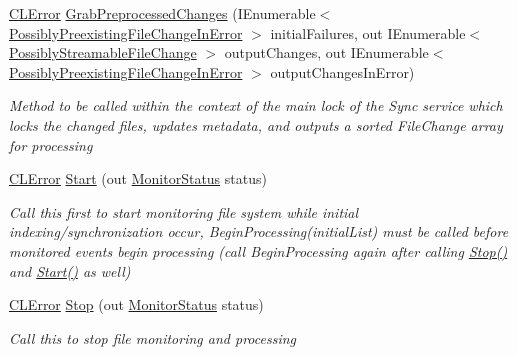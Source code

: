 \begin{DoxyCompactItemize}
\item 
\hyperlink{class_cloud_api_public_1_1_model_1_1_c_l_error}{C\-L\-Error} \hyperlink{class_file_monitor_1_1_monitor_agent_abb33d7c21700394389e5be0801b6f290}{Grab\-Preprocessed\-Changes} (I\-Enumerable$<$ \hyperlink{struct_cloud_api_public_1_1_model_1_1_possibly_preexisting_file_change_in_error}{Possibly\-Preexisting\-File\-Change\-In\-Error} $>$ initial\-Failures, out I\-Enumerable$<$ \hyperlink{struct_cloud_api_public_1_1_model_1_1_possibly_streamable_file_change}{Possibly\-Streamable\-File\-Change} $>$ output\-Changes, out I\-Enumerable$<$ \hyperlink{struct_cloud_api_public_1_1_model_1_1_possibly_preexisting_file_change_in_error}{Possibly\-Preexisting\-File\-Change\-In\-Error} $>$ output\-Changes\-In\-Error)
\begin{DoxyCompactList}\small\item\em Method to be called within the context of the main lock of the Sync service which locks the changed files, updates metadata, and outputs a sorted File\-Change array for processing \end{DoxyCompactList}\item 
\hyperlink{class_cloud_api_public_1_1_model_1_1_c_l_error}{C\-L\-Error} \hyperlink{class_file_monitor_1_1_monitor_agent_a1fc5bca23e82e87243e4e64743b8cd6d}{Start} (out \hyperlink{namespace_cloud_api_public_1_1_static_a31db95951688473984962a22ad05a45f}{Monitor\-Status} status)
\begin{DoxyCompactList}\small\item\em Call this first to start monitoring file system while initial indexing/synchronization occur, Begin\-Processing(initial\-List) must be called before monitored events begin processing (call Begin\-Processing again after calling \hyperlink{class_file_monitor_1_1_monitor_agent_ab12233c2b615d78afb7608477f7f4d70}{Stop()} and \hyperlink{class_file_monitor_1_1_monitor_agent_a1fc5bca23e82e87243e4e64743b8cd6d}{Start()} as well) \end{DoxyCompactList}\item 
\hyperlink{class_cloud_api_public_1_1_model_1_1_c_l_error}{C\-L\-Error} \hyperlink{class_file_monitor_1_1_monitor_agent_ab12233c2b615d78afb7608477f7f4d70}{Stop} (out \hyperlink{namespace_cloud_api_public_1_1_static_a31db95951688473984962a22ad05a45f}{Monitor\-Status} status)
\begin{DoxyCompactList}\small\item\em Call this to stop file monitoring and processing \end{DoxyCompactList}\item 

\end{DoxyCompactItemize}
